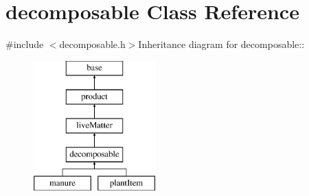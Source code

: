 \hypertarget{classdecomposable}{
\section{decomposable Class Reference}
\label{classdecomposable}
}


{\ttfamily \#include $<$decomposable.h$>$}Inheritance diagram for decomposable::\begin{figure}[H]
\begin{center}
\leavevmode
\includegraphics[height=5cm]{classdecomposable}
\end{center}
\end{figure}
